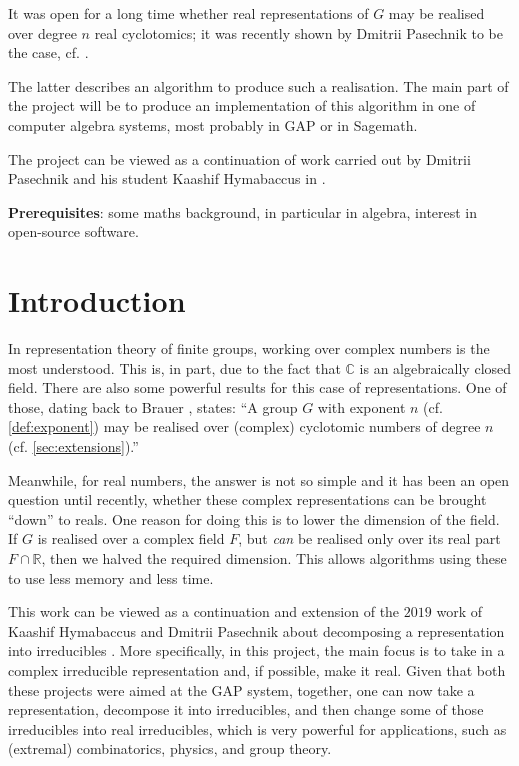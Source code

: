 \documentclass[11pt]{article}
\begin{document}
It was open for a long time whether real representations of $G$ may be realised
over degree $n$ real cyclotomics; it was recently shown by Dmitrii Pasechnik to
be the case, cf. \cite{Pas21}.

The latter describes an algorithm to produce such a realisation. The main part
of the project will be to produce an implementation of this algorithm in one of
computer algebra systems, most probably in GAP or in Sagemath.

The project can be viewed as a continuation of work carried out by Dmitrii
Pasechnik and his student Kaashif Hymabaccus in \cite{Hymabaccus2020}.

\textbf{Prerequisites}: some maths background, in particular in algebra,
interest in open-source software.

\newpage

\tableofcontents

\newpage

\section{Introduction}

In representation theory of finite groups, working over complex numbers is the
most understood. This is, in part, due to the fact that $\mathbb{C}$ is an
algebraically closed field. There are also some powerful results for this case of
representations. One of those, dating back to Brauer \cite[(10.3)]{ISAACS},
states: ``A group $G$ with exponent $n$ (cf. \cref{def:exponent}) may be
realised over (complex) cyclotomic numbers of degree $n$
(cf. \cref{sec:extensions}).''

Meanwhile, for real numbers, the answer is not so simple and it has been an open
question until recently, whether these complex representations can be brought
``down'' to reals. One reason for doing this is to lower the dimension of the
field. If $G$ is realised over a complex field $F$, but \textit{can} be
realised only over its real part $F \cap \mathbb{R}$, then we halved the required
dimension. This allows algorithms using these to use less memory and less time.

This work can be viewed as a continuation and extension of the $2019$ work of
Kaashif Hymabaccus and Dmitrii Pasechnik about decomposing a representation into
irreducibles \cite{Hymabaccus2020}. More specifically, in this project, the main
focus is to take in a complex irreducible representation and, if possible,
make it real. Given that both these projects were aimed at the GAP system,
together, one can now take a representation, decompose it into irreducibles, and
then change some of those irreducibles into real irreducibles, which is very
powerful for applications, such as (extremal) combinatorics, physics, and
group theory.
\end{document}
